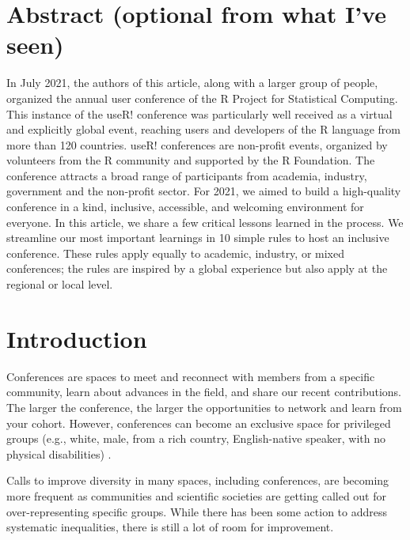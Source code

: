 \documentclass[10pt,letterpaper]{article}
\begin{document}
\section*{Abstract (optional from what I've seen)}

In July 2021, the authors of this article, along with a larger group of people, organized the annual user conference of the R Project for Statistical Computing. This instance of the useR! conference was particularly well received as a virtual and explicitly global event, reaching users and developers of the R language from more than 120 countries. useR! conferences are non-profit events, organized by volunteers from the R community and supported by the R Foundation. The conference attracts a broad range of participants from academia, industry, government and the non-profit sector. For 2021, we aimed to build a high-quality conference in a kind, inclusive, accessible, and welcoming environment for everyone. In this article, we share a few critical lessons learned in the process. We streamline our most important learnings in 10 simple rules to host an inclusive conference. These rules apply equally to academic, industry, or mixed conferences; the rules are inspired by a global experience but also apply at the regional or local level.



\linenumbers

\section*{Introduction}

Conferences are spaces to meet and reconnect with members from a specific community, learn about advances in the field, and share our recent contributions. The larger the conference, the larger the opportunities to network and learn from your cohort. However, conferences can become an exclusive space for privileged groups (e.g., white, male, from a rich country, English-native speaker, with no physical disabilities)  \cite{arend_disparity_2019, timperley_he_2020, gewin_what_2019, brown_ableism_2018}.

Calls to improve diversity in many spaces, including conferences, are becoming more frequent as communities and scientific societies are getting called out for over-representing specific groups. While there has been some action to address systematic inequalities, there is still a lot of room for improvement.
\end{document}
